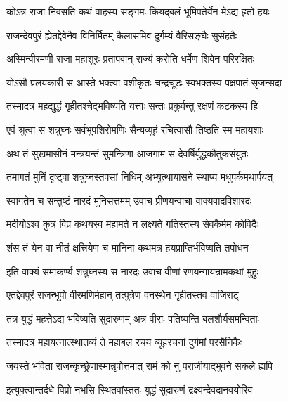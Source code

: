 \twolineshloka
{कोऽत्र राजा निवसति कथं वाहस्य सङ्गमः}
{कियद्बलं भूमिपतेर्येन मेऽद्य हृतो हयः}%


\twolineshloka
{राजन्देवपुरं ह्येतद्देवेनैव विनिर्मितम्}
{कैलासमिव दुर्गम्यं वैरिसङ्घैः सुसंहतैः}%

\twolineshloka
{अस्मिन्वीरमणी राजा महाशूरः प्रतापवान्}
{राज्यं करोति धर्मेण शिवेन परिरक्षितः}%

\twolineshloka
{योऽसौ प्रलयकारी स आस्ते भक्त्या वशीकृतः}
{चन्द्रचूडः स्वभक्तस्य पक्षपातं सृजन्सदा}%

\twolineshloka
{तस्मादत्र महद्युद्धं गृहीतश्चेद्भविष्यति}
{यत्ताः सन्तः प्रकुर्वन्तु रक्षणं कटकस्य हि}%

\twolineshloka
{एवं श्रुत्वा स शत्रुघ्नः सर्वभूपशिरोमणिः}
{सैन्यव्यूहं रचित्वासौ तिष्ठति स्म महायशाः}%

\twolineshloka
{अथ तं सुखमासीनं मन्त्रयन्तं सुमन्त्रिणा}
{आजगाम स देवर्षिर्युद्धकौतुकसंयुतः}%

\twolineshloka
{तमागतं मुनिं दृष्ट्वा शत्रुघ्नस्तपसां निधिम्}
{अभ्युत्थायासने स्थाप्य मधुपर्कमथार्पयत्}%

\twolineshloka
{स्वागतेन च सन्तुष्टं नारदं मुनिसत्तमम्}
{उवाच प्रीणयन्वाचा वाक्यवादविशारदः}%


\twolineshloka
{मदीयोऽश्व कुत्र विप्र कथयस्व महामते}
{न लक्ष्यते गतिस्तस्य सेवकैर्मम कोविदैः}%

\twolineshloka
{शंस तं येन वा नीतं क्षत्त्रियेण च मानिना}
{कथमत्र हयप्राप्तिर्भविष्यति तपोधन}%

\twolineshloka
{इति वाक्यं समाकर्ण्य शत्रुघ्नस्य स नारदः}
{उवाच वीणां रणयन्गायन्रामकथां मुहुः}%


\twolineshloka
{एतद्देवपुरं राजन्भूपो वीरमणिर्महान्}
{तत्पुत्रेण वनस्थेन गृहीतस्तव वाजिराट्}%

\twolineshloka
{तत्र युद्धं महत्तेऽद्य भविष्यति सुदारुणम्}
{अत्र वीराः पतिष्यन्ति बलशौर्यसमन्विताः}%

\twolineshloka
{तस्मादत्र महायत्नात्स्थातव्यं ते महाबल}
{रचय व्यूहरचनां दुर्गमां परसैनिकैः}%

\twolineshloka
{जयस्ते भविता राजन्कृच्छ्रेणास्मान्नृपोत्तमात्}
{रामं को नु पराजीयाद्भुवने सकले ह्यपि}%

\twolineshloka
{इत्युक्त्वान्तर्दधे विप्रो नभसि स्थितवांस्ततः}
{युद्धं सुदारुणं द्रक्ष्यन्देवदानवयोरिव}%

